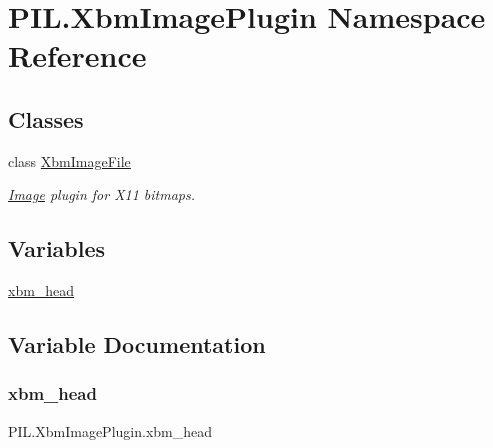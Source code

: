 \hypertarget{namespacePIL_1_1XbmImagePlugin}{}\section{P\+I\+L.\+Xbm\+Image\+Plugin Namespace Reference}
\label{namespacePIL_1_1XbmImagePlugin}
\subsection*{Classes}
\begin{DoxyCompactItemize}
\item 
class \hyperlink{classPIL_1_1XbmImagePlugin_1_1XbmImageFile}{Xbm\+Image\+File}
\begin{DoxyCompactList}\small\item\em \hyperlink{namespacePIL_1_1Image}{Image} plugin for X11 bitmaps. \end{DoxyCompactList}\end{DoxyCompactItemize}
\subsection*{Variables}
\begin{DoxyCompactItemize}
\item 
\hyperlink{namespacePIL_1_1XbmImagePlugin_afc4291d73973ef93db6afd4ffdbe7656}{xbm\+\_\+head}
\end{DoxyCompactItemize}


\subsection{Variable Documentation}
\mbox{\label{namespacePIL_1_1XbmImagePlugin_afc4291d73973ef93db6afd4ffdbe7656}} 
\subsubsection{\texorpdfstring{xbm\+\_\+head}{xbm\_head}}
{\footnotesize\ttfamily P\+I\+L.\+Xbm\+Image\+Plugin.\+xbm\+\_\+head}

